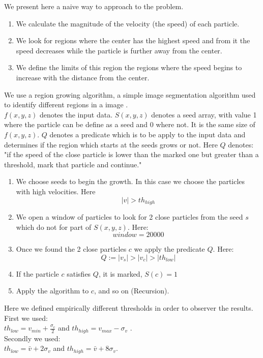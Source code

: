 \documentclass[12pt]{article}
\begin{document}
We present here a naive way to approach to the problem. 
\begin{enumerate}
	\item We calculate the magnitude of the velocity (the speed) of each particle. 
	\item We look for regions where the center has the highest speed and from it the speed decreases while the particle is further away from the center. 
    \item We define the limits of this region the regions where the speed begins to increase with the distance from the center.
\end{enumerate}

We use a region growing algorithm, a simple image segmentation algorithm
used to identify different regions in a image \cite{gonzalez_digital_2008}.\\
$f(x,y,z)$ denotes the input data. $S(x,y,z)$ denotes a seed array, with
value 1 where the particle can be define as a seed and 0 where not. It is the
same size of $f(x,y,z)$. $Q$ denotes a predicate which is to be apply to the
input data and determines if the region which starts at the seeds grows or
not. Here $Q$ denotes: "if the speed of the close particle is lower than the
marked one but greater than a threshold, mark that particle and continue."

\begin{enumerate}
	\item We choose seeds to begin the growth. In this case we choose the particles with high velocities. Here \[ |v|>  th_{high}\]
	\item We open a window of particles to look for 2 close particles from the seed $s$ which do not for part of $S(x,y,z)$. Here:
    \[ window = 20000\]
    \item Once we found the 2 close particles $c$ we apply the predicate $Q$. Here:
    \[ Q := |v_s| > |v_c| > |th_{low}|\]
    
    \item If the particle $c$ satisfies $Q$, it is marked, $S(c) = 1$
    \item Apply the algorithm to $c$, and so on (Recursion).
\end{enumerate}

Here we defined empirically different thresholds in order to observer the results. \\
First we used:  \\
$th_{low} = v_{min} + \frac{\sigma_{v}}{2} $ and $th_{high} = v_{max}  - \sigma_{v}$ .\\
Secondly we used: \\
$th_{low} = \bar{v} + 2  \sigma_{v} $ and $th_{high} = \bar{v}  +  8 \sigma_{v}$.\\
\end{document}
